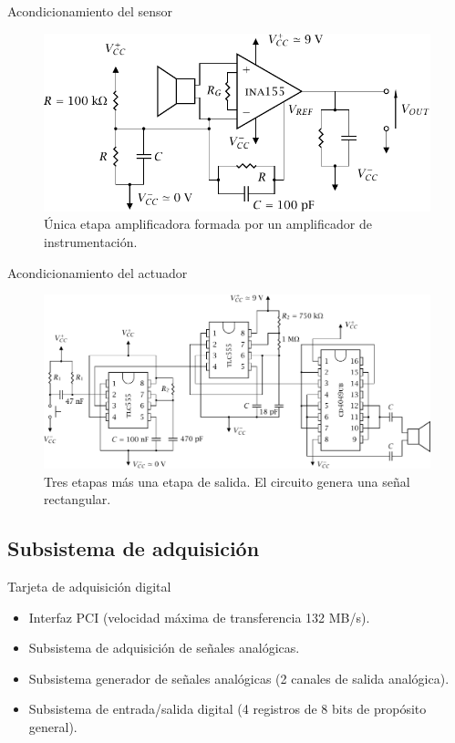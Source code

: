 \documentclass[utf8, compress]			{beamer}
\begin{document}
\begin{frame}{Acondicionamiento del sensor}
    \begin{figure}
	\centering
	\includegraphics[scale=.5]{sensor.pdf}
	\caption{Única etapa amplificadora formada por un amplificador de
	instrumentación.}
	\label{fig:sensor}
    \end{figure}
\end{frame}

\begin{frame}{Acondicionamiento del actuador}
    \begin{figure}
	\centering
	\includegraphics[scale=.5]{actuador.pdf}
	\caption{Tres etapas más una etapa de salida. El circuito genera
	una señal rectangular.}
	\label{fig:actuator}
    \end{figure}
\end{frame}


\subsection{Subsistema de adquisición}

\begin{frame}{Tarjeta de adquisición digital}
    \begin{itemize}
	\item Interfaz PCI (velocidad máxima de transferencia 132 MB/s).
	\item Subsistema de adquisición de señales analógicas.
	\item Subsistema generador de señales analógicas (2 canales de
	    salida analógica).
	\item Subsistema de entrada/salida digital (4 registros de 8 bits
	    de propósito general).
    \end{itemize}
\end{frame}
\end{document}
